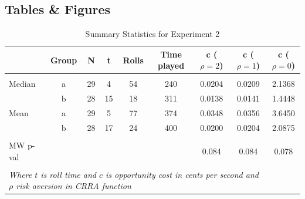 \documentclass[a4paper,12pt]{article}
\begin{document}
\begin{appendices}

\section{Tables \& Figures}
\label{appendix:graphs}


\begin{table}
  \caption{Summary Statistics for Experiment 2}
  \label{table:descriptive-3}
  \begin{center}
    \begin{tabular}{lcccccccc}
      \hline
      & Group & N & t &  Rolls  &  Time played & c ($\rho = 2$) & c ($\rho = 1$) & c ($\rho = 0$)\\
      \hline
      \hline \\ [-1.8ex]
      Median &         a & 29 &          4 &    54 &  240 &        0.0204 &                 0.0209 &                    2.1368  \\
      &         b & 28 &         15 &    18 &  311 &               0.0138 &                 0.0141 &                    1.4448  \\
      Mean &         a & 29 &          5 &    77 &  374 &          0.0348 &                 0.0356 &                    3.6450  \\
       &         b & 28 &         17 &    24 &  400 &              0.0200 &                 0.0204 &                    2.0875  \\
      \hline \\ [-1.8ex]
      MW p-val & & & & & & 0.084 & 0.084 & 0.078 \\
      \hline \\ [-1.8ex]
      \multicolumn{8}{l}{\textit{Where $t$ is roll time and $c$ is opportunity cost in cents per second and $\rho$ risk aversion in CRRA function}} \\
    \end{tabular}
  \end{center}
\end{table}


\end{appendices}
\end{document}
